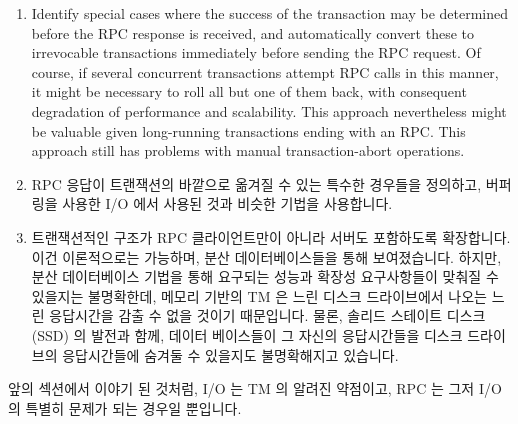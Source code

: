 \begin{enumerate}
\item	Identify special cases where the success of the transaction may
	be determined before the RPC response is received, and
	automatically convert these to irrevocable transactions immediately
	before sending the RPC request.
	Of course, if several concurrent transactions attempt RPC calls
	in this manner, it might be necessary to roll all but one of them
	back, with consequent degradation of performance and scalability.
	This approach nevertheless might be valuable given long-running
	transactions ending with an RPC.
	This approach still has problems with manual transaction-abort
	operations.
\fi
\item	RPC 응답이 트랜잭션의 바깥으로 옮겨질 수 있는 특수한 경우들을 정의하고,
	버퍼링을 사용한 I/O 에서 사용된 것과 비슷한 기법을 사용합니다.
\item	트랜잭션적인 구조가 RPC 클라이언트만이 아니라 서버도 포함하도록
	확장합니다.
	이건 이론적으로는 가능하며, 분산 데이터베이스들을 통해 보여졌습니다.
	하지만, 분산 데이터베이스 기법을 통해 요구되는 성능과 확장성
	요구사항들이 맞춰질 수 있을지는 불명확한데, 메모리 기반의 TM 은 느린
	디스크 드라이브에서 나오는 느린 응답시간을 감출 수 없을 것이기
	때문입니다.
	물론, 솔리드 스테이트 디스크 (SSD) 의 발전과 함께, 데이터 베이스들이 그
	자신의 응답시간들을 디스크 드라이브의 응답시간들에 숨겨둘 수 있을지도
	불명확해지고 있습니다.

\end{enumerate}

앞의 섹션에서 이야기 된 것처럼, I/O 는 TM 의 알려진 약점이고, RPC 는 그저 I/O
의 특별히 문제가 되는 경우일 뿐입니다.

